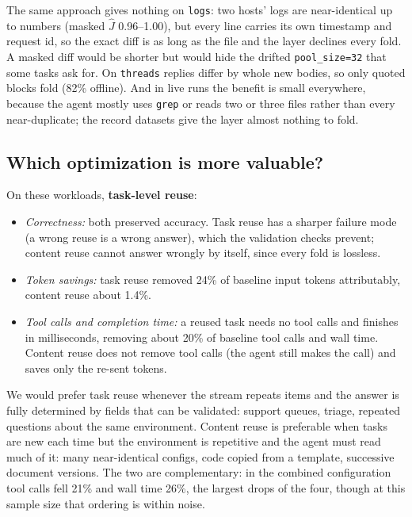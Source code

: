 \documentclass[11pt]{article}
\begin{document}
The same approach gives nothing on \texttt{logs}: two hosts' logs are near-identical up to
numbers (masked $\hat J$ 0.96--1.00), but every line carries its own timestamp and request
id, so the exact diff is as long as the file and the layer declines every fold. A masked
diff would be shorter but would hide the drifted \texttt{pool\_size=32} that some tasks ask
for. On \texttt{threads} replies differ by whole new bodies, so only quoted blocks fold
(82\% offline). And in live runs the benefit is small everywhere, because the agent mostly
uses \texttt{grep} or reads two or three files rather than every near-duplicate; the record
datasets give the layer almost nothing to fold.

\subsection{Which optimization is more valuable?}

On these workloads, \textbf{task-level reuse}:

\begin{itemize}
  \item \emph{Correctness:} both preserved accuracy. Task reuse has a sharper failure mode
        (a wrong reuse is a wrong answer), which the validation checks prevent; content
        reuse cannot answer wrongly by itself, since every fold is lossless.
  \item \emph{Token savings:} task reuse removed 24\% of baseline input tokens attributably,
        content reuse about 1.4\%.
  \item \emph{Tool calls and completion time:} a reused task needs no tool calls and finishes
        in milliseconds, removing about 20\% of baseline tool calls and wall time. Content
        reuse does not remove tool calls (the agent still makes the call) and saves only the
        re-sent tokens.
\end{itemize}

We would prefer task reuse whenever the stream repeats items and the answer is fully
determined by fields that can be validated: support queues, triage, repeated questions about
the same environment. Content reuse is preferable when tasks are new each time but the
environment is repetitive and the agent must read much of it: many near-identical configs,
code copied from a template, successive document versions. The two are complementary: in the
combined configuration tool calls fell 21\% and wall time 26\%, the largest drops of the
four, though at this sample size that ordering is within noise.
\end{document}

